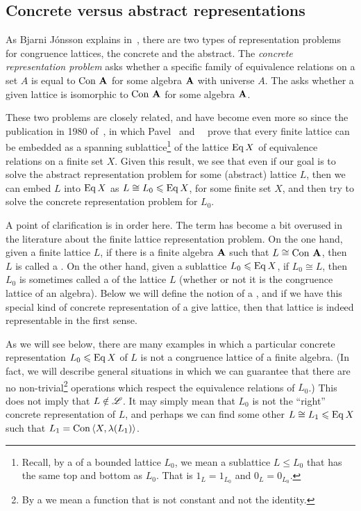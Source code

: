 \subsection{Concrete versus abstract representations}
As Bjarni J\'onsson explains in~\cite{Jonsson:1972}, there are two types of
representation problems for congruence lattices, the concrete and the
abstract.  The \emph{concrete representation problem} asks whether a specific family of
equivalence relations on a set $A$ is equal to $\operatorname{Con\,} \mathbf{A}$ for some
algebra $\mathbf{A}$ with universe $A$.  The 
asks whether a given lattice is isomorphic to $\operatorname{Con\,} \mathbf{A}$ for some algebra $\mathbf{A}$.

These two problems are closely related, and have become even more so since the
publication in 1980 
of~\cite{Pudlak:1980}, in which Pavel \Pudlak\ and
\Jiri\ \Tuma\ prove that every finite
lattice can be embedded as a 
spanning sublattice\footnote{Recall, by a 
  of a bounded lattice $L_0$, we mean a sublattice $L\leq L_0$ that has the same top and
  bottom as $L_0$.  That is  $1_L = 1_{L_0}$ and $0_L = 0_{L_0}$.}
of the lattice $\operatorname{Eq} X$ of equivalence relations on a finite set $X$.   
Given this result, we see that even if our goal is to solve the abstract
representation problem for some (abstract) lattice $L$, then
we can embed $L$ into $\operatorname{Eq} X$ as $L\cong L_0\leqslant \operatorname{Eq} X$, for some finite set
$X$, and then try to solve the concrete representation problem for $L_0$.  

A point of clarification is in order here.  The term 
has become a bit overused in the literature about the finite lattice
representation problem.  On the one hand, given a finite lattice $L$, if there
is a finite algebra $\mathbf{A}$ such that $L \cong \operatorname{Con\,} \mathbf{A}$, then $L$ is called a
.  On the other hand, given a sublattice $L_0\leqslant \operatorname{Eq} X$, 
if $L_0\cong L$, then $L_0$ is sometimes called a 
of the lattice $L$ (whether or not it is the congruence lattice of an algebra).    
Below we will define the notion of a , and if we
have this special kind of concrete representation of a give lattice, then that
lattice is indeed representable in the first sense.

As we will see below, there are many examples in which a particular concrete
representation $L_0\leqslant \operatorname{Eq} X$ of $L$ is not a congruence lattice of a
finite algebra.  (In fact, we will describe general situations in which we can
guarantee that there are no non-trivial\footnote{By a 
   we mean a function that is
  not constant and not the identity.} operations which respect the equivalence
relations of $L_0$.)  This does not imply that $L \notin \mathscr{L}$.  It may
simply mean that $L_0$ is not the ``right'' concrete representation of $L$, and
perhaps we can find some other $L \cong L_1\leqslant \operatorname{Eq} X$ such that $L_1 = \operatorname{Con\,}
\langle X, \lambda(L_1)\rangle$.

